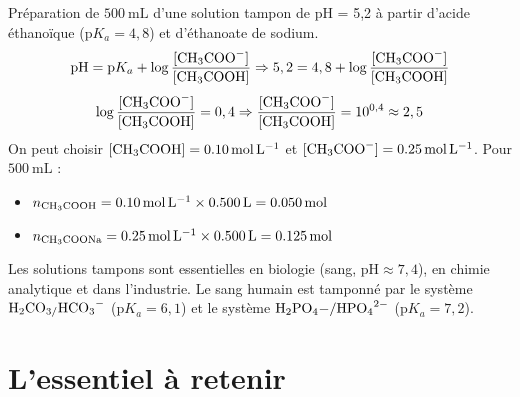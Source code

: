 \begin{exemple}
Préparation de $\SI{500}{\mL}$ d'une solution tampon de pH = 5,2 à partir d'acide éthanoïque ($\mathrm{p}K_a = 4,8$) et d'éthanoate de sodium.
\[\mathrm{pH} = \mathrm{p}K_a + \log\frac{[\ce{CH3COO-}]}{[\ce{CH3COOH}]} \Rightarrow 5,2 = 4,8 + \log\frac{[\ce{CH3COO-}]}{[\ce{CH3COOH}]}\]
\[\log\frac{[\ce{CH3COO-}]}{[\ce{CH3COOH}]} = 0,4 \Rightarrow \frac{[\ce{CH3COO-}]}{[\ce{CH3COOH}]} = 10^{0,4} \approx 2,5\]
On peut choisir $[\ce{CH3COOH}] = \SI{0,10}{\mol\per\litre}$ et $[\ce{CH3COO-}] = \SI{0,25}{\mol\per\litre}$.
Pour $\SI{500}{\mL}$ :
\begin{itemize}
    \item $n_{\ce{CH3COOH}} = \SI{0,10}{\mol\per\litre} \times \SI{0,500}{\L} = \SI{0,050}{\mol}$
    \item $n_{\ce{CH3COONa}} = \SI{0,25}{\mol\per\litre} \times \SI{0,500}{\L} = \SI{0,125}{\mol}$
\end{itemize}
\end{exemple}

\begin{aretenir}
Les solutions tampons sont essentielles en biologie (sang, $\mathrm{pH} \approx 7,4$), en chimie analytique et dans l'industrie. Le sang humain est tamponné par le système $\ce{H2CO3/HCO3-}$ ($\mathrm{p}K_a = 6,1$) et le système $\ce{H2PO4-/HPO4^2-}$ ($\mathrm{p}K_a = 7,2$).
\end{aretenir}

\section{L'essentiel à retenir}

